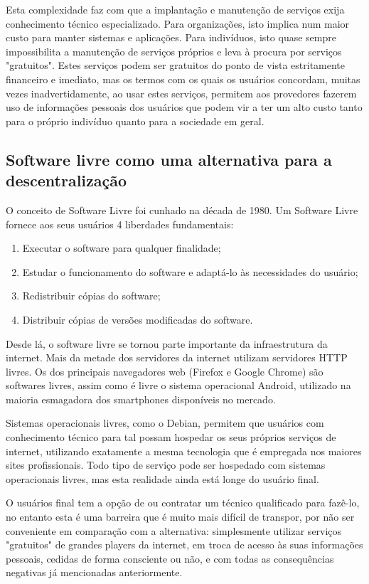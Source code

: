 \begin{anexosenv}
Esta complexidade faz com que a implantação e manutenção de serviços exija
conhecimento técnico especializado. Para organizações, isto implica num maior
custo para manter sistemas e aplicações. Para indivíduos, isto quase sempre
impossibilita a manutenção de serviços próprios e leva à procura por serviços
"gratuitos". Estes serviços podem ser gratuitos do ponto de vista estritamente
financeiro e imediato, mas os termos com os quais os usuários concordam, muitas
vezes inadvertidamente, ao usar estes serviços, permitem aos provedores fazerem
uso de informações pessoais dos usuários que podem vir a ter um alto custo
tanto para o próprio indivíduo quanto para a sociedade em geral.

\subsection{Software livre como uma alternativa para a descentralização}

O conceito de Software Livre foi cunhado na década de 1980. Um Software Livre
fornece aos seus usuários 4 liberdades fundamentais:

\begin{enumerate}
  \item Executar o software para qualquer finalidade;
  \item Estudar o funcionamento do software e adaptá-lo às necessidades do usuário;
  \item Redistribuir cópias do software; 
  \item Distribuir cópias de versões modificadas do software. 
\end{enumerate}

Desde lá, o software livre se tornou parte importante da infraestrutura da
internet. Mais da metade dos servidores da internet utilizam servidores
HTTP livres. Os dos principais navegadores web (Firefox e Google Chrome) são
softwares livres, assim como é livre o sistema operacional Android, utilizado
na maioria esmagadora dos smartphones disponíveis no mercado.

Sistemas operacionais livres, como o Debian, permitem que usuários com conhecimento
técnico para tal possam hospedar os seus próprios serviços de internet,
utilizando exatamente a mesma tecnologia que é empregada nos maiores sites
profissionais.  Todo tipo de serviço pode ser hospedado com sistemas
operacionais livres, mas esta realidade ainda está longe do usuário final.

O usuários final tem a opção de ou contratar um técnico qualificado para
fazê-lo, no entanto esta é uma barreira que é muito mais difícil de transpor,
por não ser conveniente em comparação com a alternativa: simplesmente utilizar
serviços "gratuitos" de grandes players da internet, em troca de acesso às
suas informações pessoais, cedidas de forma consciente ou não, e com todas as
consequências negativas já mencionadas anteriormente.


\end{anexosenv}
